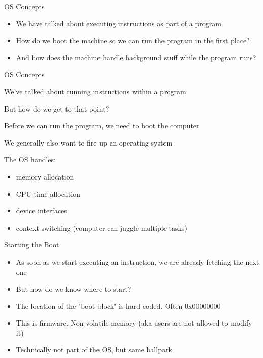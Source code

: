 
\begin{frame}{OS Concepts}
	\begin{itemize}
		\item We have talked about executing instructions as part of a program
        \item How do we boot the machine so we can run the program in the first place?
        \item And how does the machine handle background stuff while the program runs?
	\end{itemize}
\end{frame}

\begin{frame}{OS Concepts}


    We've talked about running instructions within a program

	But how do we get to that point?

	Before we can run the program, we need to boot the computer

	We generally also want to fire up an operating system

	The OS handles:

	\begin{itemize}
		\item memory allocation
		\item CPU time allocation
		\item device interfaces
		\item context switching (computer can juggle multiple tasks)
	\end{itemize}
\end{frame}








\begin{frame}{Starting the Boot}
	\begin{itemize}
		\item As soon as we start executing an instruction, we are already fetching the next one
		\item But how do we know where to start?
		\item The location of the "boot block" is hard-coded. Often 0x00000000
		\item This is firmware. Non-volatile memory (aka users are not allowed to modify it)
        \item Technically not part of the OS, but same ballpark
	\end{itemize}
\end{frame}

